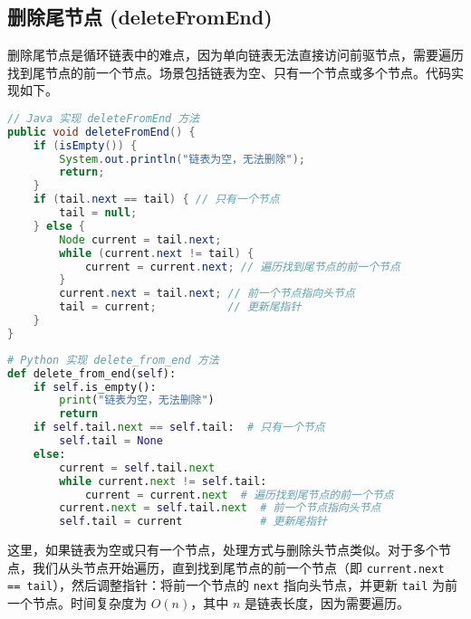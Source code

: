 \subsection{删除尾节点 (deleteFromEnd)}
删除尾节点是循环链表中的难点，因为单向链表无法直接访问前驱节点，需要遍历找到尾节点的前一个节点。场景包括链表为空、只有一个节点或多个节点。代码实现如下。\par
\begin{lstlisting}[language=java]
// Java 实现 deleteFromEnd 方法
public void deleteFromEnd() {
    if (isEmpty()) {
        System.out.println("链表为空，无法删除");
        return;
    }
    if (tail.next == tail) { // 只有一个节点
        tail = null;
    } else {
        Node current = tail.next;
        while (current.next != tail) {
            current = current.next; // 遍历找到尾节点的前一个节点
        }
        current.next = tail.next; // 前一个节点指向头节点
        tail = current;           // 更新尾指针
    }
}
\end{lstlisting}
\begin{lstlisting}[language=python]
# Python 实现 delete_from_end 方法
def delete_from_end(self):
    if self.is_empty():
        print("链表为空，无法删除")
        return
    if self.tail.next == self.tail:  # 只有一个节点
        self.tail = None
    else:
        current = self.tail.next
        while current.next != self.tail:
            current = current.next  # 遍历找到尾节点的前一个节点
        current.next = self.tail.next  # 前一个节点指向头节点
        self.tail = current            # 更新尾指针
\end{lstlisting}
这里，如果链表为空或只有一个节点，处理方式与删除头节点类似。对于多个节点，我们从头节点开始遍历，直到找到尾节点的前一个节点（即 \texttt{current.next == tail}），然后调整指针：将前一个节点的 \texttt{next} 指向头节点，并更新 \texttt{tail} 为前一个节点。时间复杂度为 $O(n)$，其中 $n$ 是链表长度，因为需要遍历。\par
